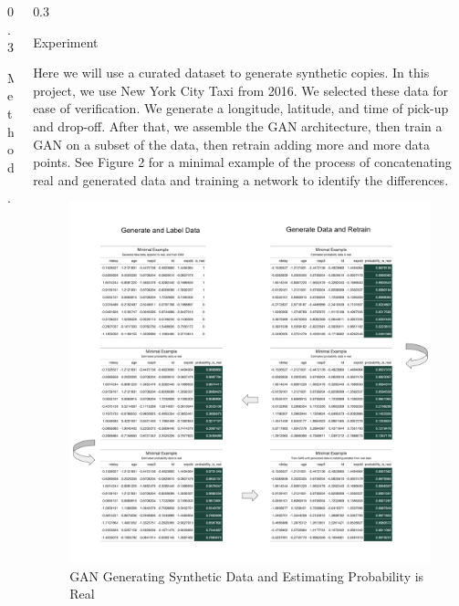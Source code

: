 \documentclass{msuposter}
\newcommand{\colwidth}{0.3\linewidth}
\begin{document}
\begin{frame}{}
\begin{columns}[t]
\begin{column}{\colwidth}
\begin{block}{Method}
\newpage 

\end{block}. 


\end{column}


\begin{column}{\colwidth}

\begin{block}{Experiment}

Here we will use a curated dataset to generate synthetic copies. In this project, we use New York City Taxi from 2016\cite{nyc2016}. We selected these data for ease of verification. We generate a longitude, latitude, and time of pick-up and drop-off. After that, we assemble the GAN architecture, then train a GAN on a subset of the data, then retrain adding more and more data points. See Figure 2 for a minimal example of the process of concatenating real and generated data and training a network to identify the differences. 


\begin{figure}
  \includegraphics[width=\linewidth]{gan_conv.png}
      	\caption{\label{fig:my-label} GAN Generating Synthetic Data and Estimating Probability is Real}
\end{figure}




\end{block}
\end{column}
\end{columns}
\end{frame}
\end{document}
